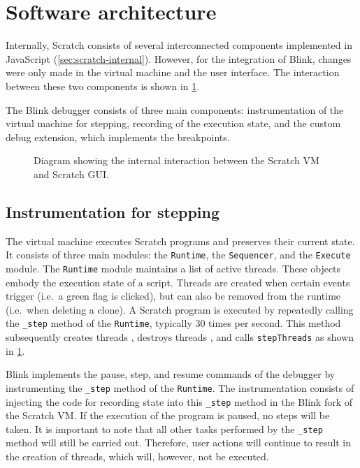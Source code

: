 \documentclass[../main]{subfiles}
\begin{document}
\section{Software architecture}\label{sec:blink-software-architecture}

Internally, Scratch consists of several interconnected components implemented in JavaScript (\cref{sec:scratch-internal}).
However, for the integration of Blink, changes were only made in the virtual machine and the user interface.
The interaction between these two components is shown in \cref{fig:blink-architecture}.

The Blink debugger consists of three main components: instrumentation of the virtual machine for stepping, recording of the execution state, and the custom debug extension, which implements the breakpoints.

\begin{figure}
    \centering
    
    \caption{
        Diagram showing the internal interaction between the Scratch VM and Scratch GUI\@.
    }
    \label{fig:blink-architecture}
\end{figure}

\subsection{Instrumentation for stepping}\label{subsec:instrumentation-for-stepping}

The virtual machine executes Scratch programs and preserves their current state.
It consists of three main modules: the \texttt{Runtime}, the \texttt{Sequencer}, and the \texttt{Execute} module.
The \texttt{Runtime} module maintains a list of active threads.
These objects embody the execution state of a script.
Threads are created when certain events trigger (i.e.\ a green flag is clicked), but can also be removed from the runtime (i.e.\ when deleting a clone).
A Scratch program is executed by repeatedly calling the \texttt{\_step} method of the \texttt{Runtime}, typically 30 times per second.
This method subsequently creates threads , destroys threads , and calls \texttt{stepThreads}  as shown in \cref{fig:blink-architecture}.

Blink implements the pause, step, and resume commands of the debugger by instrumenting the \texttt{\_step} method of the \texttt{Runtime}.
The instrumentation consists of injecting the code for recording state into this \texttt{\_step} method in the Blink fork of the Scratch VM\@.
If the execution of the program is paused, no steps will be taken.
It is important to note that all other tasks performed by the \texttt{\_step} method will still be carried out.
Therefore, user actions will continue to result in the creation of threads, which will, however, not be executed.
\end{document}
